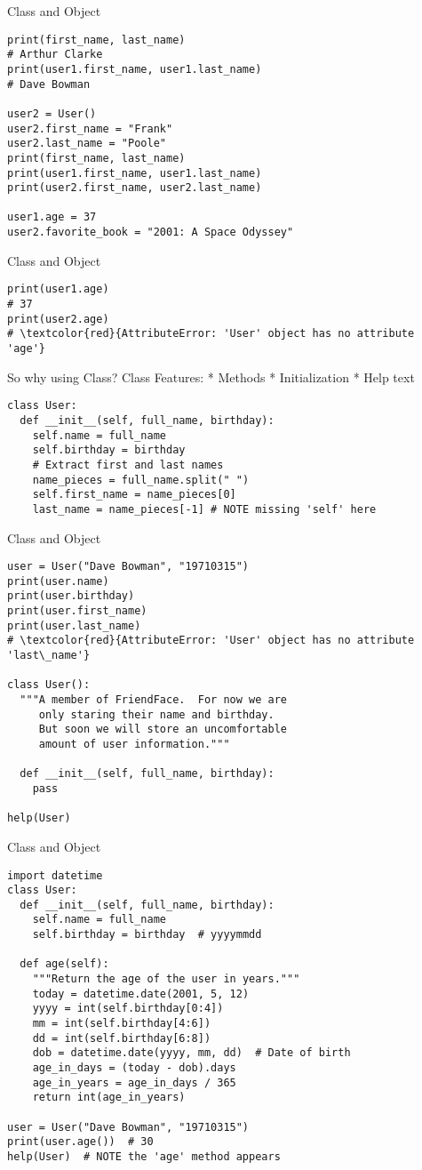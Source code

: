 \documentclass{beamer}
\begin{document}
\begin{frame}[fragile]{Class and Object}
\begin{verbatim}
print(first_name, last_name)
# Arthur Clarke
print(user1.first_name, user1.last_name)
# Dave Bowman

user2 = User()
user2.first_name = "Frank"
user2.last_name = "Poole"
print(first_name, last_name)
print(user1.first_name, user1.last_name)
print(user2.first_name, user2.last_name)

user1.age = 37
user2.favorite_book = "2001: A Space Odyssey"
\end{verbatim}
\end{frame}

\begin{frame}[fragile]{Class and Object}
\begin{verbatim}
print(user1.age)
# 37
print(user2.age)
# \textcolor{red}{AttributeError: 'User' object has no attribute 'age'}
\end{verbatim}
So why using Class? Class Features: * Methods * Initialization 
* Help text
\begin{verbatim}
class User:
  def __init__(self, full_name, birthday):
    self.name = full_name
    self.birthday = birthday
    # Extract first and last names
    name_pieces = full_name.split(" ")
    self.first_name = name_pieces[0]
    last_name = name_pieces[-1] # NOTE missing 'self' here
\end{verbatim}
\end{frame}

\begin{frame}[fragile]{Class and Object}
\begin{verbatim}
user = User("Dave Bowman", "19710315")
print(user.name)
print(user.birthday)
print(user.first_name)
print(user.last_name)
# \textcolor{red}{AttributeError: 'User' object has no attribute 'last\_name'}

class User():
  """A member of FriendFace.  For now we are 
     only staring their name and birthday.
     But soon we will store an uncomfortable 
     amount of user information."""
  
  def __init__(self, full_name, birthday):
    pass

help(User)
\end{verbatim}
\end{frame}
\begin{frame}[fragile]{Class and Object}
\begin{verbatim}
import datetime
class User:
  def __init__(self, full_name, birthday):
    self.name = full_name
    self.birthday = birthday  # yyyymmdd
  
  def age(self):
    """Return the age of the user in years."""
    today = datetime.date(2001, 5, 12)
    yyyy = int(self.birthday[0:4])
    mm = int(self.birthday[4:6])
    dd = int(self.birthday[6:8])
    dob = datetime.date(yyyy, mm, dd)  # Date of birth
    age_in_days = (today - dob).days
    age_in_years = age_in_days / 365
    return int(age_in_years)

user = User("Dave Bowman", "19710315")
print(user.age())  # 30
help(User)  # NOTE the 'age' method appears
\end{verbatim}
\end{frame}
\end{document}
